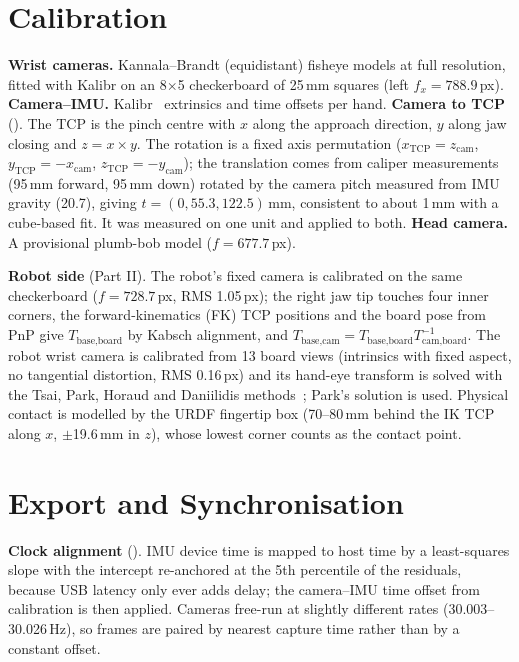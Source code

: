 \documentclass[conference,10pt]{IEEEtran}
\newcommand{\mm}{\,mm\xspace}
\begin{document}
\section{Calibration}\label{sec:cal}
\textbf{Wrist cameras.} Kannala--Brandt (equidistant) fisheye models at full resolution, fitted with Kalibr on an 8$\times$5
checkerboard of 25\mm squares (left $f_x{=}788.9$\,px). \textbf{Camera--IMU.} Kalibr~\cite{furgale2013kalibr} extrinsics and time
offsets per hand. \textbf{Camera to TCP} (). The TCP is the pinch
centre with $x$ along the approach direction, $y$ along jaw closing and $z = x\times y$. The rotation is a fixed axis permutation
($x_\text{TCP}=z_\text{cam}$, $y_\text{TCP}=-x_\text{cam}$, $z_\text{TCP}=-y_\text{cam}$); the translation comes from caliper
measurements (95\mm forward, 95\mm down) rotated by the camera pitch measured from IMU gravity (20.7\textdegree), giving
$t=(0, 55.3, 122.5)$\mm, consistent to about 1\mm with a cube-based fit. It was measured on one unit and applied to both.
\textbf{Head camera.} A provisional plumb-bob model ($f=677.7$\,px).

\textbf{Robot side} (Part II). The robot's fixed camera is calibrated on the same checkerboard ($f=728.7$\,px, RMS 1.05\,px); the
right jaw tip touches four inner corners, the forward-kinematics (FK) TCP positions and the board pose from PnP give
$T_\text{base,board}$ by Kabsch alignment, and $T_\text{base,cam}=T_\text{base,board}T_\text{cam,board}^{-1}$. The robot
wrist camera is calibrated from 13 board views (intrinsics with fixed aspect, no tangential distortion, RMS 0.16\,px) and its
hand-eye transform is solved with the Tsai, Park, Horaud and Daniilidis methods~\cite{tsai1989handeye}; Park's solution is used.
Physical contact is modelled by the URDF fingertip box (70--80\mm behind the IK TCP along $x$, $\pm$19.6\mm in $z$), whose
lowest corner counts as the contact point.

\section{Export and Synchronisation}\label{sec:export}
\textbf{Clock alignment} (). IMU device time is mapped to host time by a least-squares slope with the
intercept re-anchored at the 5th percentile of the residuals, because USB latency only ever adds delay; the camera--IMU time
offset from calibration is then applied. Cameras free-run at slightly different rates (30.003--30.026\,Hz), so frames are paired
by nearest capture time rather than by a constant offset.
\end{document}
